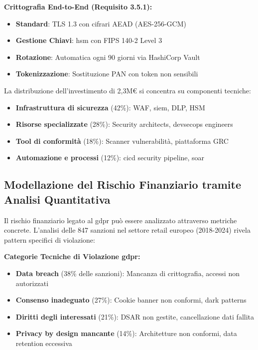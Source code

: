 \textbf{Crittografia End-to-End (Requisito 3.5.1):}
\begin{itemize}
    \item \textbf{Standard}: TLS 1.3 con cifrari AEAD (AES-256-GCM)
    \item \textbf{Gestione Chiavi}: \gls{hsm} con FIPS 140-2 Level 3
    \item \textbf{Rotazione}: Automatica ogni 90 giorni via HashiCorp Vault
    \item \textbf{Tokenizzazione}: Sostituzione PAN con token non sensibili
\end{itemize}

La distribuzione dell'investimento di 2,3M€ si concentra su componenti tecniche:
\begin{itemize}
    \item \textbf{Infrastruttura di sicurezza} (42\%): WAF, \gls{siem}, DLP, HSM
    \item \textbf{Risorse specializzate} (28\%): Security architects, \gls{devsecops} engineers
    \item \textbf{Tool di conformità} (18\%): Scanner vulnerabilità, piattaforma GRC
    \item \textbf{Automazione e processi} (12\%): \gls{cicd} security pipeline, \gls{soar}
\end{itemize}

\subsection{Modellazione del Rischio Finanziario tramite Analisi Quantitativa}

Il rischio finanziario legato al \gls{gdpr} può essere analizzato attraverso metriche concrete\autocite{mcneil2015}. L'analisi delle 847 sanzioni nel settore retail europeo (2018-2024)\autocite{EDPB2024} rivela pattern specifici di violazione:

\textbf{Categorie Tecniche di Violazione \gls{gdpr}:}
\begin{itemize}
    \item \textbf{Data breach} (38\% delle sanzioni): Mancanza di crittografia, accessi non autorizzati
    \item \textbf{Consenso inadeguato} (27\%): Cookie banner non conformi, dark patterns
    \item \textbf{Diritti degli interessati} (21\%): DSAR non gestite, cancellazione dati fallita
    \item \textbf{Privacy by design mancante} (14\%): Architetture non conformi, data retention eccessiva
\end{itemize}

